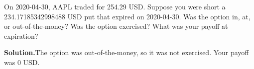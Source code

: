 \noindent On 2020-04-30, AAPL traded for 254.29 USD. Suppose you were short a 234.17185342998488 USD put that expired on 2020-04-30. Was the option in, at, or out-of-the-money? Was the option exercised? What was your payoff at expiration?

\vspace{9pt} 

\textbf{Solution.}The option was out-of-the-money, so it was not exercised. Your payoff was 0 USD.